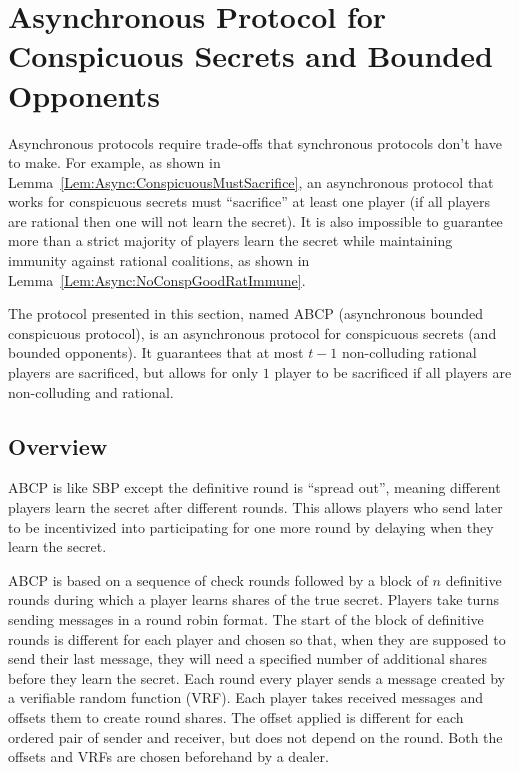 \documentclass{dalcsthesis}
\begin{document}
 




\section{Asynchronous Protocol for Conspicuous Secrets and Bounded Opponents}
\label{Sec:ABCP}

Asynchronous protocols require trade-offs that synchronous protocols don't have to make. For example, as shown in Lemma~\ref{Lem:Async:ConspicuousMustSacrifice}, an asynchronous protocol that works for conspicuous secrets must ``sacrifice'' at least one player (if all players are rational then one will not learn the secret). It is also impossible to guarantee more than a strict majority of players learn the secret while maintaining immunity against rational coalitions, as shown in Lemma~\ref{Lem:Async:NoConspGoodRatImmune}.

The protocol presented in this section, named ABCP (asynchronous bounded conspicuous protocol), is an asynchronous protocol for conspicuous secrets (and bounded opponents). It guarantees that at most $t-1$ non-colluding rational players are sacrificed, but allows for only $1$ player to be sacrificed if all players are non-colluding and rational.

\subsection{Overview}

ABCP is like SBP except the definitive round is ``spread out'', meaning different players learn the secret after different rounds. This allows players who send later to be incentivized into participating for one more round by delaying when they learn the secret.
 
ABCP is based on a sequence of check rounds followed by a block of $n$ definitive rounds during which a player learns shares of the true secret. Players take turns sending messages in a round robin format. The start of the block of definitive rounds is different for each player and chosen so that, when they are supposed to send their last message, they will need a specified number of additional shares before they learn the secret. Each round every player sends a message created by a verifiable random function (VRF). Each player takes received messages and offsets them to create round shares. The offset applied is different for each ordered pair of sender and receiver, but does not depend on the round. Both the offsets and VRFs are chosen beforehand by a dealer.
\end{document}
